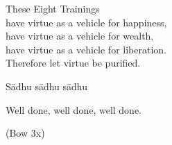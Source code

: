 \begin{english-verses}
  These Eight Trainings\\
  have virtue as a vehicle for happiness,\\
  have virtue as a vehicle for wealth,\\
  have virtue as a vehicle for liberation.\\
  Therefore let virtue be purified.\ifdigitalversion\makeatletter\hyperlink{endnote144-appendix}\makeatother\fi
\end{english-verses}

Sādhu sādhu sādhu

\begin{english}
  Well done, well done, well done.
\end{english}

\begin{center}
  (Bow 3x)
\end{center}

\clearpage

